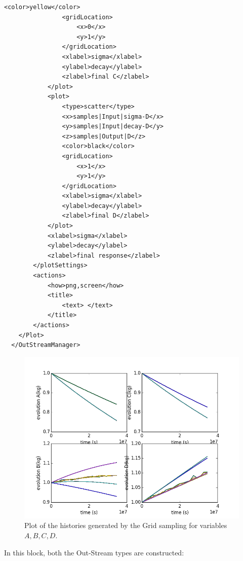 \begin{enumerate}
\begin{lstlisting}[style=XML,morekeywords={arg,extension,pauseAtEnd,overwrite}]
                <color>yellow</color>
                <gridLocation>
                    <x>0</x>
                    <y>1</y>
                </gridLocation>
                <xlabel>sigma</xlabel>
                <ylabel>decay</ylabel>
                <zlabel>final C</zlabel>
            </plot>
            <plot>
                <type>scatter</type>
                <x>samples|Input|sigma-D</x>
                <y>samples|Input|decay-D</y>
                <z>samples|Output|D</z>
                <color>black</color>
                <gridLocation>
                    <x>1</x>
                    <y>1</y>
                </gridLocation>
                <xlabel>sigma</xlabel>
                <ylabel>decay</ylabel>
                <zlabel>final D</zlabel>
            </plot>
            <xlabel>sigma</xlabel>
            <ylabel>decay</ylabel>
            <zlabel>final response</zlabel>
        </plotSettings>
        <actions>
            <how>png,screen</how>
            <title>
                <text> </text>
            </title>
        </actions>
    </Plot>
  </OutStreamManager>
\end{lstlisting}
 \begin{figure}[h!]
  \centering
  \includegraphics[scale=0.7]{pics/Grid_histories.png}
  \caption{Plot of the histories generated by the Grid sampling for variables $A,B,C,D$.}
  \label{fig:historiesGridPlotLine}
 \end{figure}
  In this block, both the Out-Stream types are constructed: 
  \begin{itemize}

\end{itemize}
\end{enumerate}
